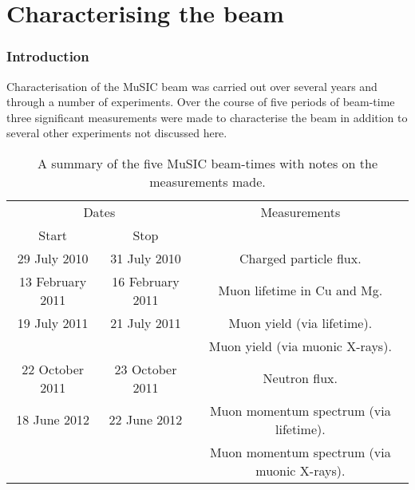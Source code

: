 \part{Characterising the beam} %
\label{prt:characterising_the_beam}
\section{Introduction} %
\label{sec:measurements_introduction}

Characterisation of the MuSIC beam was carried out over several years and through a number of experiments. Over the course of five periods of beam-time three significant measurements were made to characterise the beam in addition to several other experiments not discussed here.
\begin{table}[htpb]
  \begin{center}
  \begin{tabular}{c|c|c}
    \multicolumn{2}{c|}{Dates}          & Measurements                                \\
    Start            & Stop             &                                             \\
    \hline                                                                             
    29 July 2010     & 31 July 2010     & Charged particle flux.                      \\
    13 February 2011 & 16 February 2011 & Muon lifetime in Cu and Mg.                 \\
    19 July 2011     & 21 July 2011     & Muon yield (via lifetime).                  \\
                     &                  & Muon yield (via muonic X-rays).             \\
    22 October 2011  & 23 October 2011  & Neutron flux.                               \\
    18 June 2012     & 22 June 2012     & Muon momentum spectrum (via lifetime).      \\
                     &                  & Muon momentum spectrum (via muonic X-rays). \\
  \end{tabular}
  \end{center}
  \caption{A summary of the five MuSIC beam-times with notes on the measurements made.}
  \label{tab:summary_music_beam_time}
\end{table}

